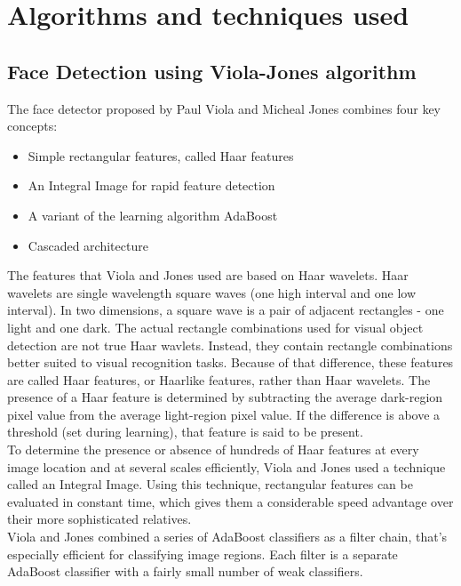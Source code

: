 \documentclass[%
        final,
        notitlepage,
        narroweqnarray,
        inline,
        ]{ieee}
\begin{document}
\section{Algorithms and techniques used}

\subsection{Face Detection using Viola-Jones algorithm}
The face detector proposed by Paul Viola and Micheal Jones\cite{Viola01} combines four key concepts\cite{servo}:
\begin{itemize}
	\item Simple rectangular features, called Haar features
	\item An Integral Image for rapid feature detection
	\item A variant of the learning algorithm AdaBoost
	\item Cascaded architecture
\end{itemize}
The features that Viola and Jones used are based on Haar wavelets.
Haar wavelets are single wavelength square waves (one high interval and one low interval).
In two dimensions, a square wave is a pair of adjacent rectangles - one light and one dark.
The actual rectangle combinations used for visual object detection are not true Haar wavlets.
Instead, they contain rectangle combinations better suited to visual recognition tasks.
Because of that difference, these features are called Haar features, or Haarlike features, rather than Haar wavelets.
The presence of a Haar feature is determined by subtracting the average dark-region pixel value from the average light-region pixel value.
If the difference is above a threshold (set during learning), that feature is said to be present.\\
To determine the presence or absence of hundreds of Haar features at every image location and at several scales efficiently, Viola and Jones used a technique called an Integral Image.
Using this technique, rectangular features can be evaluated in constant time, which gives them a considerable speed advantage over their more sophisticated relatives.\\
Viola and Jones combined a series of AdaBoost classifiers as a filter chain, that's especially efficient for classifying image regions.
Each filter is a separate AdaBoost classifier with a fairly small number of weak classifiers.
\end{document}
